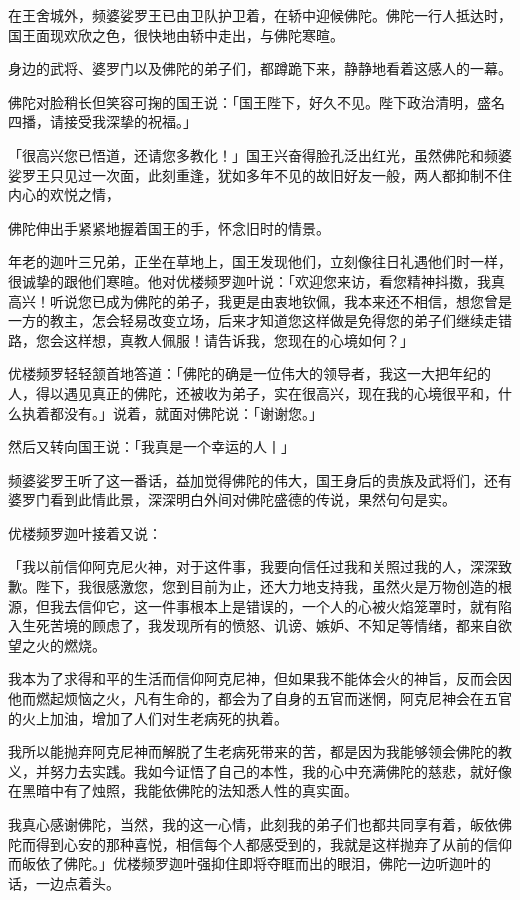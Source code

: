 \documentclass[twoside,openany]{book}
\begin{document}
在王舍城外，频婆娑罗王已由卫队护卫着，在轿中迎候佛陀。佛陀一行人抵达时，国王面现欢欣之色，很快地由轿中走出，与佛陀寒暄。

身边的武将、婆罗门以及佛陀的弟子们，都蹲跪下来，静静地看着这感人的一幕。

佛陀对脸稍长但笑容可掬的国王说：「国王陛下，好久不见。陛下政治清明，盛名四播，请接受我深挚的祝福。」

「很高兴您已悟道，还请您多教化！」国王兴奋得脸孔泛出红光，虽然佛陀和频婆娑罗王只见过一次面，此刻重逢，犹如多年不见的故旧好友一般，两人都抑制不住内心的欢悦之情，

佛陀伸出手紧紧地握着国王的手，怀念旧时的情景。

年老的迦叶三兄弟，正坐在草地上，国王发现他们，立刻像往日礼遇他们时一样，很诚挚的跟他们寒暄。他对优楼频罗迦叶说：「欢迎您来访，看您精神抖擞，我真高兴！听说您已成为佛陀的弟子，我更是由衷地钦佩，我本来还不相信，想您曾是一方的教主，怎会轻易改变立场，后来才知道您这样做是免得您的弟子们继续走错路，您会这样想，真教人佩服！请告诉我，您现在的心境如何？」

优楼频罗轻轻颔首地答道：「佛陀的确是一位伟大的领导者，我这一大把年纪的人，得以遇见真正的佛陀，还被收为弟子，实在很高兴，现在我的心境很平和，什么执着都没有。」说着，就面对佛陀说：「谢谢您。」

然后又转向国王说：「我真是一个幸运的人丨」

频婆娑罗王听了这一番话，益加觉得佛陀的伟大，国王身后的贵族及武将们，还有婆罗门看到此情此景，深深明白外间对佛陀盛德的传说，果然句句是实。

优楼频罗迦叶接着又说：

「我以前信仰阿克尼火神，对于这件事，我要向信任过我和关照过我的人，深深致歉。陛下，我很感激您，您到目前为止，还大力地支持我，虽然火是万物创造的根源，但我去信仰它，这一件事根本上是错误的，一个人的心被火焰笼罩时，就有陷入生死苦境的顾虑了，我发现所有的愤怒、讥谤、嫉妒、不知足等情绪，都来自欲望之火的燃烧。

我本为了求得和平的生活而信仰阿克尼神，但如果我不能体会火的神旨，反而会因他而燃起烦恼之火，凡有生命的，都会为了自身的五官而迷惘，阿克尼神会在五官的火上加油，增加了人们对生老病死的执着。

我所以能抛弃阿克尼神而解脱了生老病死带来的苦，都是因为我能够领会佛陀的教义，并努力去实践。我如今证悟了自己的本性，我的心中充满佛陀的慈悲，就好像在黑暗中有了烛照，我能依佛陀的法知悉人性的真实面。

我真心感谢佛陀，当然，我的这一心情，此刻我的弟子们也都共同享有着，皈依佛陀而得到心安的那种喜悦，相信每个人都感受到的，我就是这样抛弃了从前的信仰而皈依了佛陀。」优楼频罗迦叶强抑住即将夺眶而出的眼泪，佛陀一边听迦叶的话，一边点着头。
\end{document}
